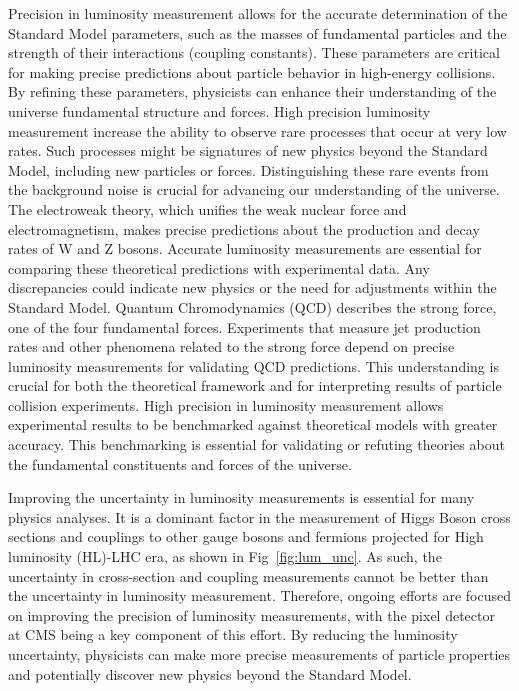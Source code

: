 Precision in luminosity measurement allows for the accurate determination of the Standard Model parameters, such as the masses of fundamental particles and the strength of their interactions (coupling constants). These parameters are critical for making precise predictions about particle behavior in high-energy collisions. By refining these parameters, physicists can enhance their understanding of the universe fundamental structure and forces.
High precision luminosity measurement increase the ability to observe rare processes that occur at very low rates. Such processes might be signatures of new physics beyond the Standard Model, including new particles or forces. Distinguishing these rare events from the background noise is crucial for advancing our understanding of the universe.
The electroweak theory, which unifies the weak nuclear force and electromagnetism, makes precise predictions about the production and decay rates of W and Z bosons. Accurate luminosity measurements are essential for comparing these theoretical predictions with experimental data. Any discrepancies could indicate new physics or the need for adjustments within the Standard Model.
Quantum Chromodynamics (QCD) describes the strong force, one of the four fundamental forces. Experiments that measure jet production rates and other phenomena related to the strong force depend on precise luminosity measurements for validating QCD predictions. This understanding is crucial for both the theoretical framework and for interpreting results of particle collision experiments.
High precision in luminosity measurement allows experimental results to be benchmarked against theoretical models with greater accuracy. This benchmarking is essential for validating or refuting theories about the fundamental constituents and forces of the universe.

Improving the uncertainty in luminosity measurements is essential for many physics analyses.
It is a dominant factor in the measurement of Higgs Boson cross sections and couplings to other gauge bosons and fermions projected for High luminosity (HL)-LHC era, as shown in Fig~\ref{fig:lum_unc}. As such, the uncertainty in cross-section and coupling measurements cannot be better than the uncertainty in luminosity measurement. Therefore, ongoing efforts are focused on improving the precision of luminosity measurements, with the pixel detector at CMS being a key component of this effort. By reducing the luminosity uncertainty, physicists can make more precise measurements of particle properties and potentially discover new physics beyond the Standard Model.

